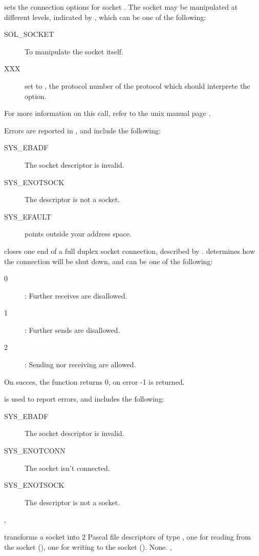 { sets the connection options for socket .
The socket may be manipulated at different levels, indicated by ,
which can be one of the following:
\begin{description}
\item[SOL\_SOCKET] To manipulate the socket itself. 
\item[XXX] set  to , the protocol number of the protocol
which should interprete the option.
 \end{description}
For more information on this call, refer to the unix manual page .
}
{Errors are reported in , and include the following:
\begin{description}
\item[SYS\_EBADF] The socket descriptor is invalid.
\item[SYS\_ENOTSOCK] The descriptor is not a socket.
\item[SYS\_EFAULT]  points outside your address space.
\end{description}
}
{}

{ closes one end of a full duplex socket connection, described
by .  determines how the connection will be shut down,
and can be one of the following:
\begin{description}
\item[0] : Further receives are disallowed.
\item[1] : Further sends are disallowed.
\item[2] : Sending nor receiving are allowed.
\end{description}

On succes, the function returns 0, on error -1 is returned.
}
{ is used to report errors, and includes the following:
\begin{description}
\item[SYS\_EBADF] The socket descriptor is invalid.
\item[SYS\_ENOTCONN] The socket isn't connected.
\item[SYS\_ENOTSOCK] The descriptor is not a socket.
\end{description}
}{, }

{ transforms a socket  into 2 Pascal file
descriptors of type , one for reading from the socket
(), one for writing to the socket ().}
{None.}
{, }

